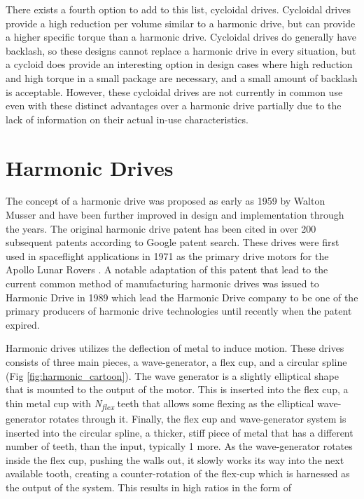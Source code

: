 There exists a fourth option to add to this list, cycloidal drives. 
Cycloidal drives provide a high reduction per volume similar to a harmonic drive, but can provide a higher specific torque than a harmonic drive. 
Cycloidal drives do generally have backlash, so these designs cannot replace a harmonic drive in every situation, but a cycloid does provide an interesting option in design cases where high reduction and high torque in a small package are necessary, and a small amount of backlash is acceptable. 
However, these cycloidal drives are not currently in common use even with these distinct advantages over a harmonic drive partially due to the lack of information on their actual in-use characteristics. 

\section{Harmonic Drives} \label{intro:harmonic}

The concept of a harmonic drive was proposed as early as 1959 by Walton Musser \cite{ref:harmonic_original} and have been further improved in design and implementation through the years. The original harmonic drive patent has been cited in over 200 subsequent patents according to Google patent search. These drives were first used in spaceflight applications in 1971 as the primary drive motors for the Apollo Lunar Rovers \cite{ref:harmonic_apollo}. A notable adaptation of this patent that lead to the current common method of manufacturing harmonic drives was issued to Harmonic Drive in 1989 \cite{ref:harmonic_drive_co} which lead the Harmonic Drive company to be one of the primary producers of harmonic drive technologies until recently when the patent expired. 

Harmonic drives utilizes the deflection of metal to induce motion. These drives consists of three main pieces, a wave-generator, a flex cup, and a circular spline (Fig \ref{fig:harmonic_cartoon}). The wave generator is a slightly elliptical shape that is mounted to the output of the motor. This is inserted into the flex cup, a thin metal cup with \textit{N\textsubscript{flex}} teeth that allows some flexing as the elliptical wave-generator rotates through it. Finally, the flex cup and wave-generator system is inserted into the circular spline, a thicker, stiff piece of metal that has a different number of teeth,  than the input, typically 1 more. As the wave-generator rotates inside the flex cup, pushing the walls out, it slowly works its way into the next available tooth, creating a counter-rotation of the flex-cup which is harnessed as the output of the system. This results in high ratios in the form of 


